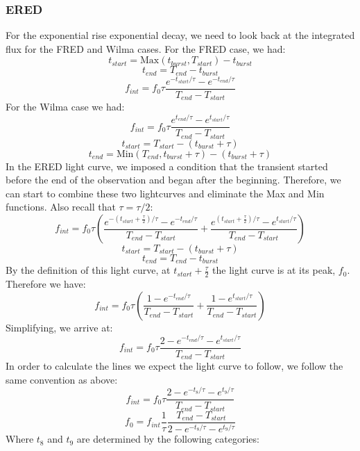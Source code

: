 \documentclass{article}
\begin{document}
\subsubsection{ERED}
For the exponential rise exponential decay, we need to look back at the integrated flux for the FRED and Wilma cases. For the FRED case, we had:
\[t_{start} = \text{Max}(t_{burst}, T_{start}) - t_{burst}\]
\[t_{end} = T_{end} - t_{burst}\]
\[f_{int} = f_0\tau \frac{e^{-t_{start}/\tau}-e^{-t_{end}/\tau}}{T_{end}-T_{start}}\]
For the Wilma case we had:
\[f_{int} = f_0\tau \frac{e^{t_{end}/\tau}-e^{t_{start}/\tau}}{T_{end}-T_{start}}\]
\[t_{start} =  T_{start} - (t_{burst}+\tau)\]
\[t_{end} = \text{Min}(T_{end},t_{burst}+\tau) - (t_{burst}+\tau)\]
In the ERED light curve, we imposed a condition that the transient started before the end of the observation and began after the beginning. Therefore, we can start to combine these two lightcurves and eliminate the Max and Min functions. Also recall that $\tau = \tau/2$:
\[f_{int} = f_0\tau( \frac{e^{-(t_{start}+\frac{\tau}{2})/\tau}-e^{-t_{end}/\tau}}{T_{end}-T_{start}} + \frac{e^{(t_{start}+\frac{\tau}{2})/\tau}-e^{t_{start}/\tau}}{T_{end}-T_{start}} ) \]
\[t_{start} =  T_{start} - (t_{burst}+\tau)\]
\[t_{end} = T_{end} - t_{burst}\]
By the definition of this light curve, at $t_{start}+\frac{\tau}{2}$ the light curve is at its peak, $f_0$. Therefore we have:
\[f_{int} = f_0\tau(\frac{ 1-e^{-t_{end}/\tau}}{T_{end}-T_{start}} + \frac{1-e^{t_{start}/\tau}}{T_{end}-T_{start}} ) \]
Simplifying, we arrive at:
\[f_{int} = f_0\tau\frac{ 2-e^{-t_{end}/\tau}-e^{t_{start}/\tau}}{T_{end}-T_{start}} \]
In order to calculate the lines we expect the light curve to follow, we follow the same convention as above:
\[f_{int} = f_0\tau\frac{ 2-e^{-t_8/\tau}-e^{t_9/\tau}}{T_{end}-T_{start}} \]
\[f_0 = f_{int}\frac{1}{\tau}\frac{T_{end}-T_{start}}{ 2-e^{-t_8/\tau}-e^{t_9/\tau}}  \]
Where $t_8$ and $t_9$ are determined by the following categories:
\end{document}
